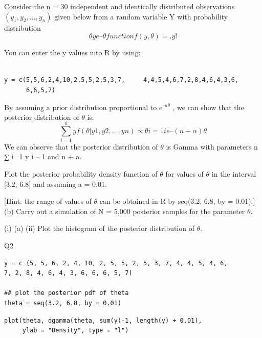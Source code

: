 \documentclass[a4paper,12pt]{article}
\begin{document}
\large
\noindent Consider the n = 30 independent and identically distributed observations
$( y_1 , y_2 , \ldots, y_n )$ given below from a random variable Y with probability distribution
\[\theta y e –\theta
function f ( y, \theta) =
.
y! \]


You can enter the y values into R by using:


\begin{framed}\begin{verbatim}

y = c(5,5,6,2,4,10,2,5,5,2,5,3,7,     4,4,5,4,6,7,2,8,4,6,4,3,6,
      6,6,5,7)

\end{verbatim}\end{framed}


By assuming a prior distribution proportional to $e^{–a\theta}$ , we can show that the posterior
distribution of $\theta$ is:
\[
\sum^{n}_{i=1}y
f (\theta | y 1 , y 2 ,..., y n ) \propto \theta i=1 i e –(n + \alpha) \theta
\]
We can observe that the posterior distribution of $\theta$ is Gamma with parameters
n
∑ i=1 y i – 1 and n + a.

\newpage 
Plot the posterior probability density function of $\theta$ for values of $\theta$ in
the interval [3.2, 6.8] and assuming a = 0.01.
		
[Hint: the range of values of $\theta$ can be obtained in R by
seq(3.2, 6.8, by = 0.01).]
(b)
Carry out a simulation of N = 5,000 posterior samples for the
parameter $\theta$.

(i) (a)
(ii) Plot the histogram of the posterior distribution of $\theta$.




Q2


\begin{framed}\begin{verbatim}
y = c (5, 5, 6, 2, 4, 10, 2, 5, 5, 2, 5, 3, 7, 4, 4, 5, 4, 6,
7, 2, 8, 4, 6, 4, 3, 6, 6, 6, 5, 7)

## plot the posterior pdf of theta
theta = seq(3.2, 6.8, by = 0.01)
\end{verbatim}\end{framed}

\newpage 

\begin{framed}\begin{verbatim}
plot(theta, dgamma(theta, sum(y)-1, length(y) + 0.01), 
     ylab = "Density", type = "l")
\end{verbatim}\end{framed}
\end{document}
